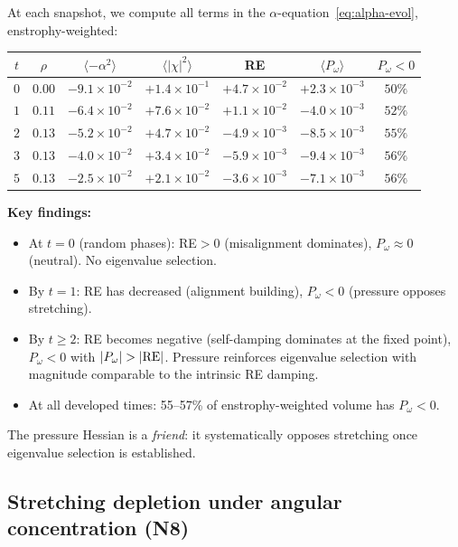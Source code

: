 \documentclass[11pt,a4paper]{article}
\theoremstyle{plain}
\theoremstyle{definition}
\theoremstyle{remark}
\begin{document}
At each snapshot, we compute all terms in
the $\alpha$-equation~\eqref{eq:alpha-evol},
enstrophy-weighted:
\begin{center}
\renewcommand{\arraystretch}{1.2}
\begin{tabular}{@{}ccccccc@{}}
\toprule
$t$ & $\rho$
  & $\langle -\alpha^2\rangle$ & $\langle|\chi|^2\rangle$
  & RE & $\langle P_\omega\rangle$
  & $P_\omega<0$ \\
\midrule
$0$ & $0.00$ & $-9.1\!\times\!10^{-2}$
  & $+1.4\!\times\!10^{-1}$ & $+4.7\!\times\!10^{-2}$
  & $+2.3\!\times\!10^{-3}$ & $50\%$ \\
$1$ & $0.11$ & $-6.4\!\times\!10^{-2}$
  & $+7.6\!\times\!10^{-2}$ & $+1.1\!\times\!10^{-2}$
  & $-4.0\!\times\!10^{-3}$ & $52\%$ \\
$2$ & $0.13$ & $-5.2\!\times\!10^{-2}$
  & $+4.7\!\times\!10^{-2}$ & $-4.9\!\times\!10^{-3}$
  & $-8.5\!\times\!10^{-3}$ & $55\%$ \\
$3$ & $0.13$ & $-4.0\!\times\!10^{-2}$
  & $+3.4\!\times\!10^{-2}$ & $-5.9\!\times\!10^{-3}$
  & $-9.4\!\times\!10^{-3}$ & $56\%$ \\
$5$ & $0.13$ & $-2.5\!\times\!10^{-2}$
  & $+2.1\!\times\!10^{-2}$ & $-3.6\!\times\!10^{-3}$
  & $-7.1\!\times\!10^{-3}$ & $56\%$ \\
\bottomrule
\end{tabular}
\end{center}
\textbf{Key findings:}
\begin{itemize}[leftmargin=2em]
\item At $t=0$ (random phases): RE$>0$ (misalignment
  dominates), $P_\omega\approx 0$ (neutral).
  No eigenvalue selection.
\item By $t=1$: RE has decreased (alignment building),
  $P_\omega<0$ (pressure opposes stretching).
\item By $t\geq 2$: RE becomes negative (self-damping
  dominates at the fixed point),
  $P_\omega<0$ with $|P_\omega|>|{\rm RE}|$.
  Pressure reinforces eigenvalue selection with
  magnitude comparable to the intrinsic RE damping.
\item At all developed times: 55--57\% of
  enstrophy-weighted volume has $P_\omega<0$.
\end{itemize}

The pressure Hessian is a \emph{friend}: it
systematically opposes stretching once eigenvalue
selection is established.

\subsection{Stretching depletion under angular
concentration (N8)}
\end{document}

